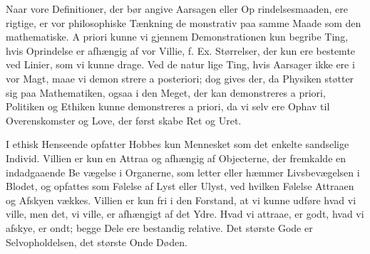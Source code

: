 \documentclass[12pt,a4paper]{book}
\begin{document}
Naar vore Definitioner, der bør angive Aarsagen eller Op\-%
rindelsesmaaden, ere rigtige, er vor philosophiske Tænkning de\-%
monstrativ paa samme Maade som den mathematiske. A priori
kunne vi gjennem Demonstrationen kun begribe Ting, hvis
Oprindelse er afhængig af vor Villie, f. Ex. Størrelser, der kun
ere bestemte ved Linier, som vi kunne drage. Ved de natur\-%
lige Ting, hvis Aarsager ikke ere i vor Magt, maae vi demon\-%
strere a posteriori; dog gives der, da Physiken støtter sig paa
Mathematiken, ogsaa i den Meget, der kan demonstreres a priori,
Politiken og Ethiken kunne demonstreres a priori, da vi selv ere
Ophav til Overenskomster og Love, der først skabe Ret og Uret.

I ethisk Henseende opfatter Hobbes kun Mennesket som
det enkelte sandselige Individ. Villien er kun en Attraa og
afhængig af Objecterne, der fremkalde en indadgaaende Be\-%
vægelse i Organerne, som letter eller hæmmer Livsbevægelsen
i Blodet, og opfattes som Følelse af Lyst eller Ulyst, ved
hvilken Følelse Attraaen og Afskyen vækkes. Villien er kun
fri i den Forstand, at vi kunne udføre hvad vi ville, men det,
vi ville, er afhængigt af det Ydre. Hvad vi attraae, er godt,
hvad vi afskye, er ondt; begge Dele ere bestandig relative.
Det største Gode er Selvopholdelsen, det største Onde Døden.
\end{document}
